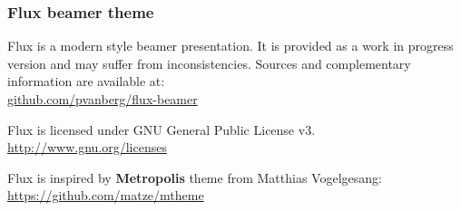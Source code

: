 \begin{frame}
	\frametitle{Flux beamer theme}
	
	Flux is a modern style beamer presentation. It is provided as a work in progress version and may suffer from inconsistencies. Sources and complementary information are available at:\\[.2\baselineskip]
	\url{github.com/pvanberg/flux-beamer}\\
	
	\vfill
	
	Flux is licensed under GNU General Public License v3.\\[.2\baselineskip]
	\url{http://www.gnu.org/licenses}\\
	
	\vfill
	
	Flux is inspired by \textbf{Metropolis} theme from Matthias Vogelgesang:\\[.2\baselineskip]
	\url{https://github.com/matze/mtheme} 
	
\end{frame}
